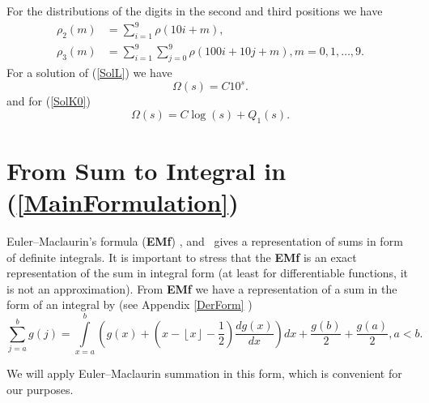 \documentclass[titlepage,fleqn]{article}%
\begin{document}
For the distributions of the digits in the second and third positions we have%
\begin{align*}
\rho_{2}(m)  &  =%
{\displaystyle\sum\limits_{i=1}^{9}}
\rho(10i+m),\\
\rho_{3}(m)  &  =%
{\displaystyle\sum\limits_{i=1}^{9}}
{\displaystyle\sum\limits_{j=0}^{9}}
\rho(100i+10j+m),m=0,1,\ldots,9.
\end{align*}
For a solution of (\ref{SolL}) we have%
\[
\Omega(s)=C10^{s}.
\]
and for (\ref{SolK0})%
\[
\Omega(s)=C\log(s)+Q_{1}(s).
\]


\section{From Sum to Integral in (\ref{MainFormulation})}%

\label{EulerMaclaurin}%
Euler--Maclaurin's formula (\textbf{EMf})%
\cite{knuth} ,\cite{wabramowitzstegun}
and \cite{knuth2}%
\ gives a representation of sums in form of definite integrals. It is
important to stress that the \textbf{EMf} is an exact representation of the
sum in integral form (at least for differentiable functions, it is not an
approximation). From \textbf{EMf} we have a representation of a sum in the
form of an integral by (see Appendix
\ref{DerForm}%
)\
\begin{equation}%
{\displaystyle\sum\limits_{j=a}^{b}}
g(j)=%
{\displaystyle\int\limits_{x=a}^{b}}
\left(  g(x)+\left(  x-\left\lfloor x\right\rfloor -\frac{1}{2}\right)
\frac{dg(x)}{dx}\right)  dx+\frac{g(b)}{2}+\frac{g(a)}{2},a<b. \label{EM00}%
\end{equation}


We will apply Euler--Maclaurin summation in this form, which is convenient for
our purposes.
\end{document}
